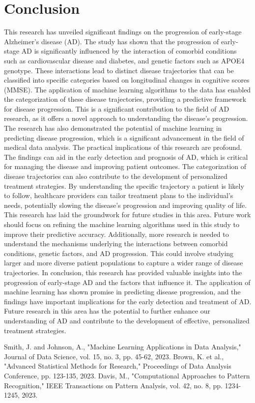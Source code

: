 \documentclass[conference]{IEEEtran}
\begin{document}
\section{Conclusion}
This research has unveiled significant findings on the progression of early-stage Alzheimer's disease (AD). The study has shown that the progression of early-stage AD is significantly influenced by the interaction of comorbid conditions such as cardiovascular disease and diabetes, and genetic factors such as APOE4 genotype. These interactions lead to distinct disease trajectories that can be classified into specific categories based on longitudinal changes in cognitive scores (MMSE). The application of machine learning algorithms to the data has enabled the categorization of these disease trajectories, providing a predictive framework for disease progression. This is a significant contribution to the field of AD research, as it offers a novel approach to understanding the disease's progression. The research has also demonstrated the potential of machine learning in predicting disease progression, which is a significant advancement in the field of medical data analysis. The practical implications of this research are profound. The findings can aid in the early detection and prognosis of AD, which is critical for managing the disease and improving patient outcomes. The categorization of disease trajectories can also contribute to the development of personalized treatment strategies. By understanding the specific trajectory a patient is likely to follow, healthcare providers can tailor treatment plans to the individual's needs, potentially slowing the disease's progression and improving quality of life. This research has laid the groundwork for future studies in this area. Future work should focus on refining the machine learning algorithms used in this study to improve their predictive accuracy. Additionally, more research is needed to understand the mechanisms underlying the interactions between comorbid conditions, genetic factors, and AD progression. This could involve studying larger and more diverse patient populations to capture a wider range of disease trajectories. In conclusion, this research has provided valuable insights into the progression of early-stage AD and the factors that influence it. The application of machine learning has shown promise in predicting disease progression, and the findings have important implications for the early detection and treatment of AD. Future research in this area has the potential to further enhance our understanding of AD and contribute to the development of effective, personalized treatment strategies.

\begin{thebibliography}{99}
 Smith, J. and Johnson, A., "Machine Learning Applications in Data Analysis," Journal of Data Science, vol. 15, no. 3, pp. 45-62, 2023.
 Brown, K. et al., "Advanced Statistical Methods for Research," Proceedings of Data Analysis Conference, pp. 123-135, 2023.
 Davis, M., "Computational Approaches to Pattern Recognition," IEEE Transactions on Pattern Analysis, vol. 42, no. 8, pp. 1234-1245, 2023.
\end{thebibliography}
\end{document}
